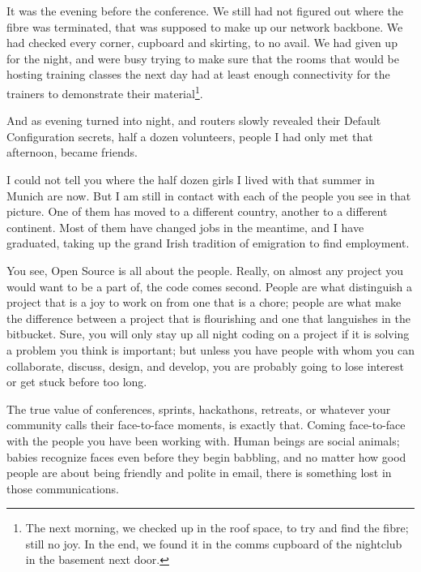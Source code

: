 It was the evening before the conference. We still had not figured out
where the fibre was terminated, that was supposed to make up our
network backbone. We had checked every corner, cupboard and skirting, to
no avail. We had given up for the night, and were busy trying to make
sure that the rooms that would be hosting training classes the next
day had at least enough connectivity for the trainers to demonstrate
their material\footnote{The next morning, we checked up in the roof space, to
try and find
the fibre; still no joy. In the end, we found it in the comms cupboard
of the nightclub in the basement next door.}.

And as evening turned into night, and routers slowly revealed their
Default Configuration secrets, half a dozen volunteers, people I had
only met that afternoon, became friends.

I could not tell you where the half dozen girls I lived with that
summer in Munich are now. But I am still in contact with each of the
people you see in that picture. One of them has moved to a different
country, another to a different continent. Most of them have changed
jobs in the meantime, and I have graduated, taking up the grand Irish
tradition of emigration to find employment.

You see, Open Source is all about the people. Really, on almost any
project you would want to be a part of, the code comes second. People are
what distinguish a project that is a joy to work on from one that is a
chore; people are what make the difference between a project that is
flourishing and one that languishes in the bitbucket. Sure, you will
only stay up all night coding on a project if it is solving a problem
you think is important; but unless you have people with whom you can
collaborate, discuss, design, and develop, you are probably going to
lose interest or get stuck before too long.

The true value of conferences, sprints, hackathons, retreats, or
whatever your community calls their face-to-face moments, is exactly
that. Coming face-to-face with the people you have been working with.
Human beings are social animals; babies recognize faces even before
they begin babbling, and no matter how good people are about being
friendly and polite in email, there is something lost in those
communications.


